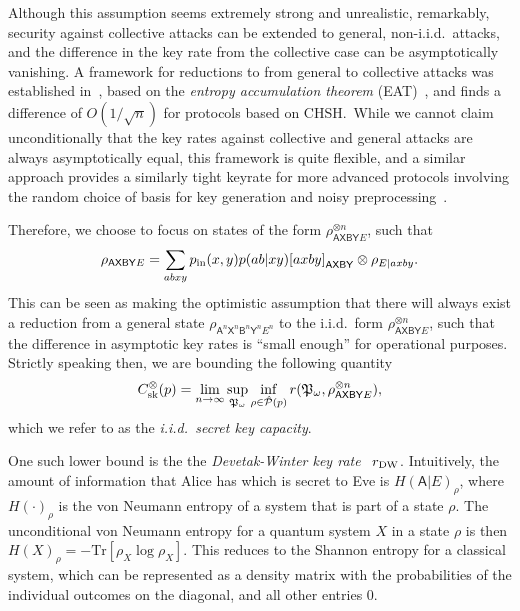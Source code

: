 \documentclass[10pt, a4paper]{article}
\numberwithin{equation}{section} %
\theoremstyle{definition}
\theoremstyle{plain}
\newcommand{\?}{\mathrel{?}} %
\newcommand{\Tr}{\mathrm{Tr}} %
\newcommand{\crv}[1]{\mathsf{#1}}
\newcommand{\proj}[2][]{{[#2]}_{#1}}
\newcommand{\compatstates}[2][]{\hat{\mathcal{P}}#1(#2)}
\newcommand{\sk}{\rm sk}
\newcommand{\DW}{\rm DW}
\begin{document}
    Although this assumption seems extremely strong and unrealistic, remarkably, security against collective attacks can be extended to general, non-i.i.d.\ attacks, and the difference in the key rate from the collective case can be asymptotically vanishing. A framework for reductions to from general to collective attacks was established in~\cite{DI_Proofs}, based on the \emph{entropy accumulation theorem} (EAT)~\cite{EntAcc}, and finds a difference of \(O(1/\sqrt{n})\) for protocols based on CHSH.\ While we cannot claim unconditionally that the key rates against collective and general attacks are always asymptotically equal, this framework is quite flexible, and a similar approach provides a similarly tight keyrate for more advanced protocols involving the random choice of basis for key generation and noisy preprocessing~\cite{Improved_DIQKD}.

   Therefore, we choose to focus on states of the form \( \rho_{\crv{AXBY}E}^{\otimes n} \), such that
      \begin{align}
        \rho_{\crv{AXBY}E} = \sum_{abxy} p_{\rm in}(x,y) p(ab|xy) \proj[\crv{AXBY}]{axby} \otimes \rho_{E|axby}.
      \end{align}
      This can be seen as making the optimistic assumption that there will always exist a reduction from a general state \(\rho_{\crv{A}^n\crv{X}^n \crv{B}^n\crv{Y}^n E^n}\) to the i.i.d.\ form \( \rho_{\crv{AXBY}E}^{\otimes n} \), such that the difference in asymptotic key rates is ``small enough'' for operational purposes. Strictly speaking then, we are bounding the following quantity
    \begin{equation}\label{eqn:seckeycapbehaviid}
      C_{\sk}^{\otimes}(p) = \lim_{n\to\infty} \sup_{\mathfrak{P}_{\omega}} \inf_{\rho \in \compatstates{p}} r(\mathfrak{P}_{\omega}, \rho_{\crv{A}\crv{X} \crv{B}\crv{Y} E}^{\otimes{n}}),
    \end{equation}
    which we refer to as the \emph{i.i.d.\ secret key capacity}.

    One such lower bound is the the \emph{Devetak-Winter key rate}~\cite{DevetakWinter} \(r_{\DW}\). Intuitively, the amount of information that Alice has which is secret to Eve is \({H(\crv{A}|E)}_{\rho}\), where \({H(\cdot)}_{\rho}\) is the von Neumann entropy of a system that is part of a state \(\rho\). The unconditional von Neumann entropy for a quantum system \(X\) in a state \(\rho\) is then \({H(X)}_{\rho} = -\Tr\left[\rho_{X}\log\rho_{X}\right]\). This reduces to the Shannon entropy for a classical system, which can be represented as a density matrix with the probabilities of the individual outcomes on the diagonal, and all other entries 0.
\end{document}
